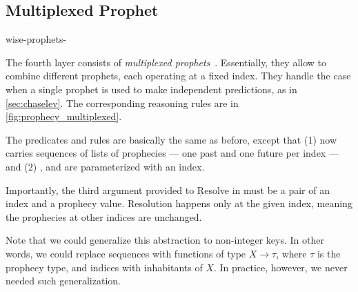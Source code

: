 \subsection{Multiplexed Prophet}
\label{sec:prophecy_multiplexed}

\begin{tirPrefix}{wise-prophets-}



The fourth layer consists of \emph{multiplexed prophets}~.
Essentially, they allow to combine different prophets, each operating at a fixed index.
They handle the case when a single prophet is used to make independent predictions, as in \cref{sec:chaselev}.
The corresponding reasoning rules are in \cref{fig:prophecy_multiplexed}.

The predicates and rules are basically the same as before, except that (1) \model now carries sequences of lists of prophecies --- one past and one future per index --- and (2) \full, \snapshot and \lb are parameterized with an index.

Importantly, the third argument provided to \c{Resolve} in  must be a pair of an index and a prophecy value.
Resolution happens only at the given index, meaning the prophecies at other indices are unchanged.

Note that we could generalize this abstraction to non-integer keys.
In other words, we could replace sequences with functions of type $X \rightarrow \tau$, where $\tau$ is the prophecy type, and indices with inhabitants of $X$.
In practice, however, we never needed such generalization.

\end{tirPrefix}
